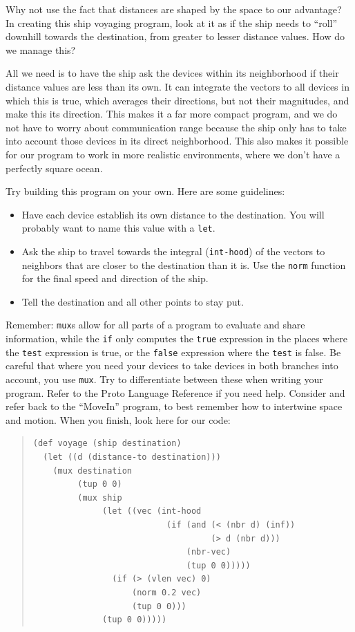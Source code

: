 \documentclass{article}
\newcommand\var[1]{{\tt #1}}
\begin{document}
Why not use the fact that distances are shaped by the space to our
advantage?  In creating this ship voyaging program, look at it as if
the ship needs to ``roll'' downhill towards the destination, from
greater to lesser distance values.  How do we manage this?

All we need is to have the ship ask the devices within its
neighborhood if their distance values are less than its own.  It can
integrate the vectors to all devices in which this is true, which
averages their directions, but not their magnitudes, and make this its
direction.  This makes it a far more compact program, and we do not
have to worry about communication range because the ship only has to
take into account those devices in its direct neighborhood.  This also
makes it possible for our program to work in more realistic
environments, where we don't have a perfectly square ocean.

Try building this program on your own. Here are some guidelines:
\begin{itemize}
\item Have each device establish its own distance to the destination.
  You will probably want to name this value with a \var{let}.
\item Ask the ship to travel towards the integral (\var{int-hood}) of
  the vectors to neighbors that are closer to the destination than it
  is.  Use the \var{norm} function for the final speed and direction
  of the ship.
\item Tell the destination and all other points to stay put.
\end{itemize}

Remember: \var{mux}s allow for all parts of a program to evaluate and
share information, while the \var{if} only computes the \var{true}
expression in the places where the \var{test} expression is true, or
the \var{false} expression where the \var{test} is false.  Be careful
that where you need your devices to take devices in both branches into
account, you use \var{mux}.  Try to differentiate between these when
writing your program.  Refer to the Proto Language Reference if you
need help.  Consider and refer back to the ``MoveIn'' program, to best
remember how to intertwine space and motion.  When you finish, look
here for our code:

\begin{quote}
\begin{verbatim}
(def voyage (ship destination)
  (let ((d (distance-to destination)))
    (mux destination
         (tup 0 0)
         (mux ship
              (let ((vec (int-hood
                           (if (and (< (nbr d) (inf))
                                    (> d (nbr d)))
                               (nbr-vec)
                               (tup 0 0)))))
                (if (> (vlen vec) 0)
                    (norm 0.2 vec)
                    (tup 0 0)))
              (tup 0 0)))))
\end{verbatim}
\end{quote}
\end{document}
